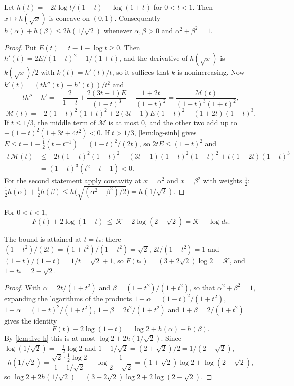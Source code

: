 \begin{lemma}\label{lem:five-h}
Let $h(t)=-2t\log t/(1-t)-\log(1+t)$ for $0<t<1$. Then $x\mapsto h(\sqrt x)$ is concave on
$(0,1)$. Consequently $h(\alpha)+h(\beta)\le2h(1/\sqrt2)$ whenever $\alpha,\beta>0$ and
$\alpha^2+\beta^2=1$.
\end{lemma}

\begin{proof}
Put $E(t)=t-1-\log t\ge0$. Then $h'(t)=2E/(1-t)^2-1/(1+t)$, and the derivative of $h(\sqrt x)$
is $k(\sqrt x)/2$ with $k(t)=h'(t)/t$, so it suffices that $k$ is nonincreasing. Now
$k'(t)=(th''(t)-h'(t))/t^2$ and
\[
 th''-h'=-\frac{2}{1-t}+\frac{2(3t-1)E}{(1-t)^3}+\frac{1+2t}{(1+t)^2}
 =\frac{\mathcal M(t)}{(1-t)^3(1+t)^2},
\]
\[
 \mathcal M(t)=-2(1-t)^2(1+t)^2+2(3t-1)E(1+t)^2+(1+2t)(1-t)^3 .
\]
If $t\le1/3$, the middle term of $\mathcal M$ is at most $0$, and the other two add up to
$-(1-t)^2(1+3t+4t^2)<0$. If $t>1/3$, \cref{lem:log-sinh} gives
$E\le t-1-\tfrac12(t-t^{-1})=(1-t)^2/(2t)$, so $2tE\le(1-t)^2$ and
\begin{align*}
 t\,\mathcal M(t)&\le-2t(1-t)^2(1+t)^2+(3t-1)(1+t)^2(1-t)^2+t(1+2t)(1-t)^3\\
 &=(1-t)^3(t^2-t-1)<0.
\end{align*}
For the second statement apply concavity at $x=\alpha^2$ and $x=\beta^2$ with weights $\tfrac12$:
$\tfrac12h(\alpha)+\tfrac12h(\beta)\le h\bigl(\sqrt{(\alpha^2+\beta^2)/2}\bigr)=h(1/\sqrt2)$.
\end{proof}

\begin{lemma}\label{lem:five-envelope}
For $0<t<1$,
\[
 F(t)+2\log(1-t)\ \le\ \mathcal K+2\log(2-\sqrt2)=\mathcal K+\log d_*.
\]
\end{lemma}

The bound is attained at $t=t_*$: there $(1+t^2)/(2t)=(1+t^2)/(1-t^2)=\sqrt2$,
$2t/(1-t^2)=1$ and $(1+t)/(1-t)=1/t=\sqrt2+1$, so $F(t_*)=(3+2\sqrt2)\log2=\mathcal K$, and
$1-t_*=2-\sqrt2$.

\begin{proof}
With $\alpha=2t/(1+t^2)$ and $\beta=(1-t^2)/(1+t^2)$, so that $\alpha^2+\beta^2=1$, expanding
the logarithms of the products $1-\alpha=(1-t)^2/(1+t^2)$, $1+\alpha=(1+t)^2/(1+t^2)$,
$1-\beta=2t^2/(1+t^2)$ and $1+\beta=2/(1+t^2)$ gives the identity
\[
 F(t)+2\log(1-t)=\log2+h(\alpha)+h(\beta).
\]
By \cref{lem:five-h} this is at most $\log2+2h(1/\sqrt2)$. Since $\log(1/\sqrt2)=-\tfrac12\log2$
and $1+1/\sqrt2=(2+\sqrt2)/2=1/(2-\sqrt2)$,
\[
 h(1/\sqrt2)=\frac{\sqrt2\cdot\tfrac12\log2}{1-1/\sqrt2}-\log\frac{1}{2-\sqrt2}
 =(1+\sqrt2)\log2+\log(2-\sqrt2),
\]
so $\log2+2h(1/\sqrt2)=(3+2\sqrt2)\log2+2\log(2-\sqrt2)$.
\end{proof}

